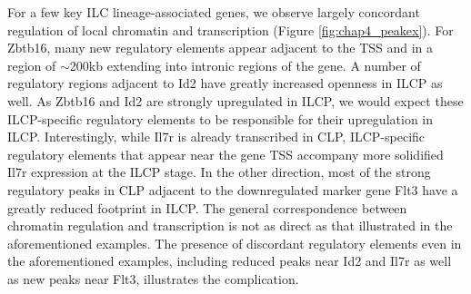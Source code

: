 For a few key ILC lineage-associated genes, we observe largely concordant regulation of local chromatin and transcription (Figure \ref{fig:chap4_peakex}). For Zbtb16, many new regulatory elements appear adjacent to the TSS and in a region of $\sim$200kb extending into intronic regions of the gene. A number of regulatory regions adjacent to Id2 have greatly increased openness in ILCP as well. As Zbtb16 and Id2 are strongly upregulated in ILCP, we would expect these ILCP-specific regulatory elements to be responsible for their upregulation in ILCP. Interestingly, while Il7r is already transcribed in CLP, ILCP-specific regulatory elements that appear near the gene TSS accompany more solidified Il7r expression at the ILCP stage. In the other direction, most of the strong regulatory peaks in CLP adjacent to the downregulated marker gene Flt3 have a greatly reduced footprint in ILCP. The general correspondence between chromatin regulation and transcription is not as direct as that illustrated in the aforementioned examples. The presence of discordant regulatory elements even in the aforementioned examples, including reduced peaks near Id2 and Il7r as well as new peaks near Flt3, illustrates the complication. 

